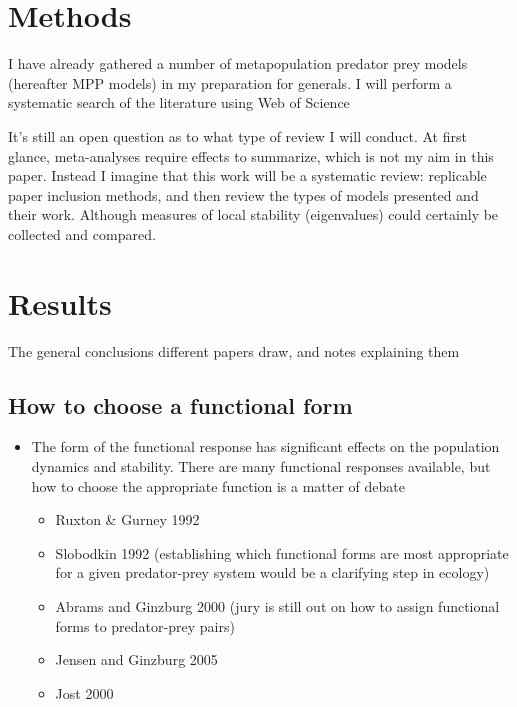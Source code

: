 \documentclass[12pt, a4paper]{article}
\begin{document}
\section{Methods}
I have already gathered a number of metapopulation predator prey models (hereafter MPP models) in my preparation for generals. I will perform a systematic search of the literature using Web of Science 

It's still an open question as to what type of review I will conduct. At first glance, meta-analyses require effects to summarize, which is not my aim in this paper. Instead I imagine that this work will be a systematic review: replicable paper inclusion methods, and then review the types of models presented and their work.  Although measures of local stability (eigenvalues) could certainly be collected and compared. 





\section{Results}
The general conclusions different papers draw, and notes explaining them


\subsection{How to choose a functional form}
\begin{itemize}
\item The form of the functional response has significant effects on the population dynamics and stability. There are many functional responses available, but how to choose the appropriate function is a matter of debate \citep{Anderson2010}
\begin{itemize}
\item Ruxton \& Gurney 1992
\item Slobodkin 1992 (establishing which functional forms are most appropriate for a given predator-prey system would be a clarifying step in ecology)
\item Abrams and Ginzburg 2000 (jury is still out on how to assign functional forms to predator-prey pairs)
\item Jensen and Ginzburg 2005
\item Jost 2000
\end{itemize}
\end{itemize}
\end{document}
